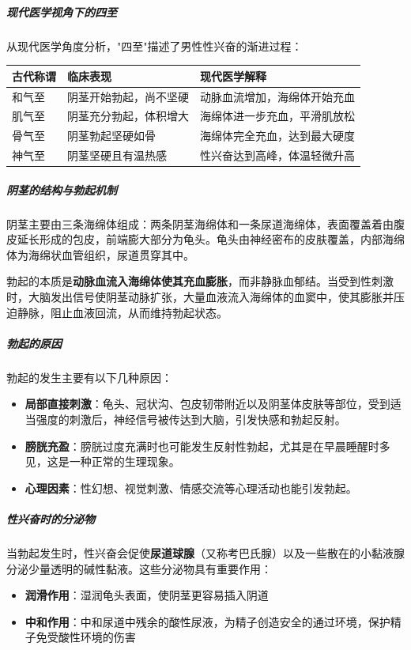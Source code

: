 \subparagraph{现代医学视角下的四至}

从现代医学角度分析，"四至"描述了男性性兴奋的渐进过程：

\begin{center}
\begin{tabular}{p{3cm} p{5cm} p{4cm}}
\toprule
\textbf{古代称谓} & \textbf{临床表现} & \textbf{现代医学解释} \\
\midrule
和气至 & 阴茎开始勃起，尚不坚硬 & 动脉血流增加，海绵体开始充血 \\
肌气至 & 阴茎充分勃起，体积增大 & 海绵体进一步充血，平滑肌放松 \\
骨气至 & 阴茎勃起坚硬如骨 & 海绵体完全充血，达到最大硬度 \\
神气至 & 阴茎坚硬且有温热感 & 性兴奋达到高峰，体温轻微升高 \\
\bottomrule
\end{tabular}
\end{center}

\subparagraph{阴茎的结构与勃起机制}

阴茎主要由三条海绵体组成：两条阴茎海绵体和一条尿道海绵体，表面覆盖着由腹皮延长形成的包皮，前端膨大部分为龟头。龟头由神经密布的皮肤覆盖，内部海绵体为海绵状血管组织，尿道贯穿其中。

勃起的本质是\textbf{动脉血流入海绵体使其充血膨胀}，而非静脉血郁结。当受到性刺激时，大脑发出信号使阴茎动脉扩张，大量血液流入海绵体的血窦中，使其膨胀并压迫静脉，阻止血液回流，从而维持勃起状态。

\subparagraph{勃起的原因}

勃起的发生主要有以下几种原因：
\begin{itemize}
    \item \textbf{局部直接刺激}：龟头、冠状沟、包皮韧带附近以及阴茎体皮肤等部位，受到适当强度的刺激后，神经信号被传达到大脑，引发快感和勃起反射。
    \item \textbf{膀胱充盈}：膀胱过度充满时也可能发生反射性勃起，尤其是在早晨睡醒时多见，这是一种正常的生理现象。
    \item \textbf{心理因素}：性幻想、视觉刺激、情感交流等心理活动也能引发勃起。
\end{itemize}

\subparagraph{性兴奋时的分泌物}

当勃起发生时，性兴奋会促使\textbf{尿道球腺}（又称考巴氏腺）以及一些散在的小黏液腺分泌少量透明的碱性黏液。这些分泌物具有重要作用：
\begin{itemize}
    \item \textbf{润滑作用}：湿润龟头表面，使阴茎更容易插入阴道
    \item \textbf{中和作用}：中和尿道中残余的酸性尿液，为精子创造安全的通过环境，保护精子免受酸性环境的伤害
\end{itemize}

